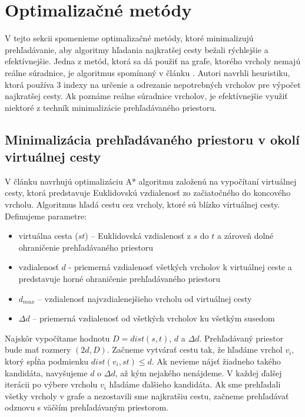 \section{Optimalizačné metódy}
\label{sec:optimalization}
V tejto sekcii spomenieme optimalizačné metódy, ktoré minimalizujú prehľadávanie, aby algoritmy hľadania najkratšej cesty bežali rýchlejšie a efektívnejšie. Jedna z metód, ktorá sa dá použiť na grafe, ktorého vrcholy nemajú reálne súradnice, je algoritmus spomínaný v článku \cite{IBAS}. Autori navrhli heuristiku, ktorá používa 3 indexy na určenie a odrezanie nepotrebných vrcholov pre výpočet najkratšej cesty. Ak poznáme reálne súradnice vrcholov, je efektívnejšie využiť niektoré z techník minimalizácie prehľadávaného priestoru.

\subsection{Minimalizácia prehľadávaného priestoru v okolí virtuálnej cesty}

V článku \cite{timedependent} navrhujú optimalizáciu A* algoritmu založenú na vypočítaní virtuálnej cesty, ktorá predstavuje Euklidovskú vzdialenosť zo začiatočného do koncového vrcholu. Algoritmus hľadá cestu cez vrcholy, ktoré sú blízko virtuálnej cesty. Definujeme parametre:
\begin{itemize}
\setlength\itemsep{-0.3em}
\item{virtuálna cesta ($st$) – Euklidovská vzdialenosť z $s$ do $t$} a zároveň dolné ohraničenie prehľadávaného priestoru
\item{vzdialenosť $d$ - priemerná vzdialenosť všetkých vrcholov k virtuálnej ceste a predstavuje horné ohraničenie prehľadávaného priestoru}
\item{$d_{max}$ – vzdialenosť najvzdialenejšieho vrcholu od virtuálnej cesty}
\item{$\Delta d$ – priemerná vzdialenosť od všetkých vrcholov ku všetkým susedom}
\end{itemize}

Najskôr vypočítame hodnotu $D = dist(s,t)$, $d$ a $\Delta d$. Prehľadávaný priestor bude mať rozmery $(2d,D)$. Začneme vytvárať cestu tak, že hľadáme vrchol $v_i$, ktorý spĺňa podmienku $dist(v_i, st) \leq d$. Ak nevieme nájsť žiadneho takého kandidáta, navyšujeme $d$ o $\Delta d$, až kým nejakého nenájdeme. V každej ďalšej iterácii po výbere vrcholu $v_i$ hľadáme ďalšieho kandidáta. Ak sme prehľadali všetky vrcholy v grafe a nezostavili sme najkratšiu cestu, začneme prehľadávať odznovu s väčším prehľadávaným priestorom.

